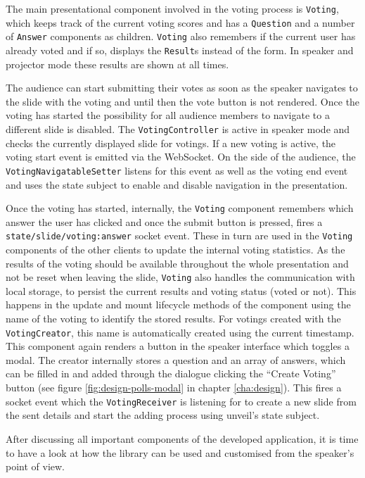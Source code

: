 The main presentational component involved in the voting process is \texttt{Voting}, which keeps track of the current voting scores and has a \texttt{Question} and a number of \texttt{Answer} components as children. \texttt{Voting} also remembers if the current user has already voted and if so, displays the \texttt{Result}s instead of the form. In speaker and projector mode these results are shown at all times.

The audience can start submitting their votes as soon as the speaker navigates to the slide with the voting and until then the vote button is not rendered. Once the voting has started the possibility for all audience members to navigate to a different slide is disabled. The \texttt{VotingController} is active in speaker mode and checks the currently displayed slide for votings. If a new voting is active, the voting start event is emitted via the WebSocket. On the side of the audience, the \texttt{VotingNavigatableSetter} listens for this event as well as the voting end event and uses the state subject to enable and disable navigation in the presentation.

Once the voting has started, internally, the \texttt{Voting} component remembers which answer the user has clicked and once the submit button is pressed, fires a \texttt{state/slide/voting:answer} socket event. These in turn are used in the \texttt{Voting} components of the other clients to update the internal voting statistics. As the results of the voting should be available throughout the whole presentation and not be reset when leaving the slide, \texttt{Voting} also handles the communication with local storage, to persist the current results and voting status (voted or not). This happens in the update and mount lifecycle methods of the component using the name of the voting to identify the stored results. For votings created with the \texttt{VotingCreator}, this name is automatically created using the current timestamp. This component again renders a button in the speaker interface which toggles a modal. The creator internally stores a question and an array of answers, which can be filled in and added through the dialogue clicking the ``Create Voting'' button (see figure \ref{fig:design-polls-modal} in chapter \ref{cha:design}). This fires a socket event which the \texttt{VotingReceiver} is listening for to create a new slide from the sent details and start the adding process using unveil's state subject.

After discussing all important components of the developed application, it is time to have a look at how the library can be used and customised from the speaker's point of view.
